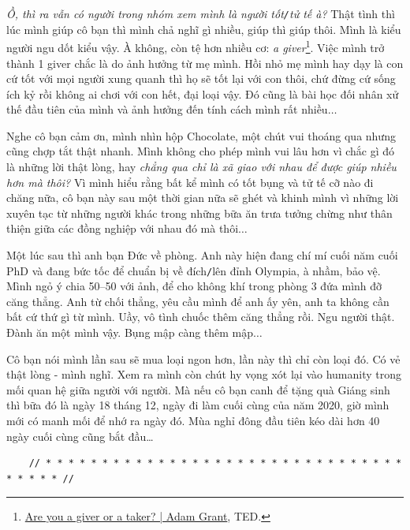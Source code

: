 \documentclass[12pt]{article}
\numberwithin{equation}{section}
\begin{document}
\textit{Ồ, thì ra vẫn có người trong nhóm xem mình là người tốt\texttt{/}tử tế à?} Thật tình thì lúc mình giúp cô bạn thì mình chả nghĩ gì nhiều, giúp thì giúp thôi. Mình là kiểu người ngu dốt kiểu vậy. À không, còn tệ hơn nhiều cơ: \textit{a giver}\footnote{\href{https://www.youtube.com/watch?v=YyXRYgjQXX0}{Are you a giver or a taker? | Adam Grant}, TED.}. Việc mình trở thành 1 giver chắc là do ảnh hưởng từ mẹ mình. Hồi nhỏ mẹ mình hay dạy là con cứ tốt với mọi người xung quanh thì họ sẽ tốt lại với con thôi, chứ đừng cứ sống ích kỷ rồi không ai chơi với con hết, đại loại vậy. Đó cũng là bài học đối nhân xử thế đầu tiên của mình và ảnh hưởng đến tính cách mình rất nhiều$\ldots$

Nghe cô bạn cảm ơn, mình nhìn hộp Chocolate, một chút vui thoáng qua nhưng cũng chợp tắt thật nhanh. Mình không cho phép mình vui lâu hơn vì chắc gì đó là những lời thật lòng, hay \textit{chẳng qua chỉ là xã giao với nhau để được giúp nhiều hơn mà thôi?} Vì mình hiểu rằng bất kể mình có tốt bụng và tử tế cỡ nào đi chăng nữa, cô bạn này sau một thời gian nữa sẽ ghét và khinh mình vì những lời xuyên tạc từ những người khác trong những bữa ăn trưa tưởng chừng như thân thiện giữa các đồng nghiệp với nhau đó mà thôi$\ldots$

Một lúc sau thì anh bạn Đức về phòng. Anh này hiện đang chí mí cuối năm cuối PhD và đang bức tốc để chuẩn bị về đích\texttt{/}lên đỉnh Olympia, à nhầm, bảo vệ. Mình ngỏ ý chia 50--50 với ảnh, để cho không khí trong phòng 3 đứa mình đỡ căng thẳng. Anh từ chối thẳng, yêu cầu mình để anh ấy yên, anh ta không cần bất cứ thứ gì từ mình. Uầy, vô tình chuốc thêm căng thẳng rồi. Ngu người thật. Đành ăn một mình vậy. Bụng mập càng thêm mập$\ldots$

Cô bạn nói mình lần sau sẽ mua loại ngon hơn, lần này thì chỉ còn loại đó. Có vẻ thật lòng - mình nghĩ. Xem ra mình còn chút hy vọng xót lại vào humanity trong mối quan hệ giữa người với người. Mà nếu cô bạn canh để tặng quà Giáng sinh thì bữa đó là ngày 18 tháng 12, ngày đi làm cuối cùng của năm 2020, giờ mình mới có manh mối để nhớ ra ngày đó. Mùa nghỉ đông đầu tiên kéo dài hơn 40 ngày cuối cùng cũng bắt đầu\ldots

\begin{verbatim}
    // * * * * * * * * * * * * * * * * * * * * * * * * * * * * * * * * * * * * * //
\end{verbatim}
\end{document}
